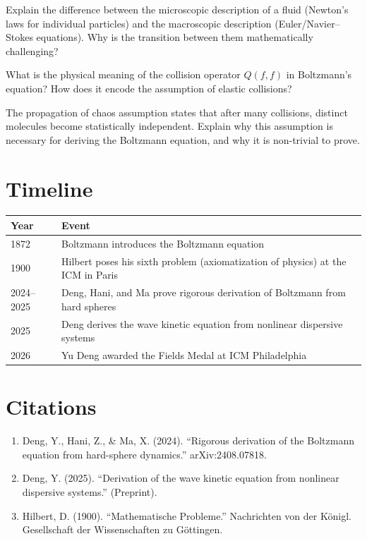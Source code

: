 \begin{exercise}[Basic]
Explain the difference between the microscopic description of a fluid (Newton's laws for individual particles) and the macroscopic description (Euler/Navier--Stokes equations). Why is the transition between them mathematically challenging?
\end{exercise}

\begin{exercise}[Intermediate]
What is the physical meaning of the collision operator $Q(f,f)$ in Boltzmann's equation? How does it encode the assumption of elastic collisions?
\end{exercise}

\begin{exercise}[Challenge]
The propagation of chaos assumption states that after many collisions, distinct molecules become statistically independent. Explain why this assumption is necessary for deriving the Boltzmann equation, and why it is non-trivial to prove.
\end{exercise}

\section{Timeline}

\begin{tabularx}{\linewidth}{lX}
\toprule
\textbf{Year} & \textbf{Event} \\ \midrule
1872 & Boltzmann introduces the Boltzmann equation \\
1900 & Hilbert poses his sixth problem (axiomatization of physics) at the ICM in Paris \\
2024--2025 & Deng, Hani, and Ma prove rigorous derivation of Boltzmann from hard spheres \\
2025 & Deng derives the wave kinetic equation from nonlinear dispersive systems \\
2026 & Yu Deng awarded the Fields Medal at ICM Philadelphia \\
\bottomrule
\end{tabularx}

\section{Citations}

\begin{enumerate}
\item Deng, Y., Hani, Z., \& Ma, X. (2024). ``Rigorous derivation of the Boltzmann equation from hard-sphere dynamics.'' arXiv:2408.07818.
\item Deng, Y. (2025). ``Derivation of the wave kinetic equation from nonlinear dispersive systems.'' (Preprint).
\item Hilbert, D. (1900). ``Mathematische Probleme.'' Nachrichten von der K\"onigl. Gesellschaft der Wissenschaften zu G\"ottingen.
\end{enumerate}
